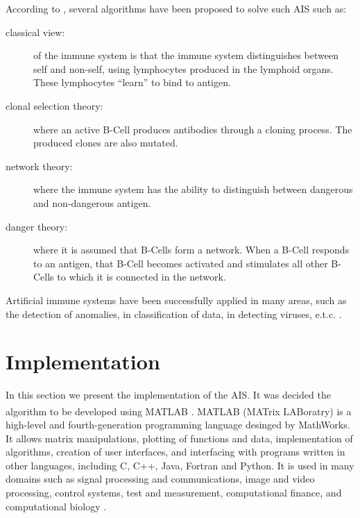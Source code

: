 \documentclass{assignment}
\begin{document}
According to \textcite{engelbrecht}, several algorithms have been proposed to solve such AIS such as:
\begin{description}

\item[classical view:] of the immune system is that the immune system distinguishes between self and non-self, using lymphocytes produced in the lymphoid organs. These lymphocytes “learn” to bind to antigen.

\item[clonal selection theory:]  where an active B-Cell produces antibodies through a cloning process. The produced clones are also mutated.

\item[network theory:] where the immune system has the ability to distinguish between dangerous and non-dangerous antigen.

\item[danger theory:] where it is assumed that B-Cells form a network. When a B-Cell responds to an antigen, that B-Cell becomes activated and stimulates all other B-Cells to which it is connected in the network.

\end{description}

Artificial immune systems have been successfully applied in many areas, such as the detection of anomalies, in classification of data, in detecting viruses, e.t.c. \cite{wiki:artificial_immune_system, engelbrecht, karakasis_thesis}.


\section{Implementation}

In this section we present the implementation of the AIS. It was decided the algorithm to be developed using MATLAB\textsuperscript{\textregistered} \cite{MATLAB:2014}. MATLAB\textsuperscript{\textregistered} (MATrix LABoratry) is a high-level and fourth-generation programming language desinged by MathWorks. It allows matrix manipulations, plotting of functions and data, implementation of algorithms, creation of user interfaces, and interfacing with programs written in other languages, including C, C++, Java, Fortran and Python. It is used in many domains such as signal processing and communications, image and video processing, control systems, test and measurement, computational finance, and computational biology \cite{wiki:matlab,MATLAB:2014}.
\end{document}
